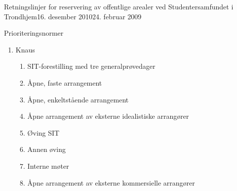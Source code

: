 \begin{instruks}{Retningslinjer for reservering av offentlige arealer
    ved Studentersamfundet i Trondhjem}{16. desember 2010}{24. februar 2009}
\begin{instruksledd}{Prioriteringsnormer}
\begin{enumerate}
\begin{enumerate}
\begin{enumerate}
                            \item Åpne, faste arrangement\footnote{Med ``åpne, faste
                                arrangement'' menes regelmessige arrangementer/konsepter som er åpne for alle og som
                                arrangeres av en av Samfundets gjenger.}
                            \item Fotball
                            \item Åpne, enkeltstående arrangement \footnote{Med ``åpne,
                                enkeltstående arrangement'' menes arrangementer som er åpne for alle og som arrangeres av en
                        av Samfundets gjenger, men som ikke faller inn under noe fast,
                        jevnlig konsept.}
                            \item Åpne arrangement av eksterne idealistiske arrangører (utlån)
                            \item Øvinger
                            \item Faste interne arrangement\footnote{For eksempel Mingle
                                Vingle}
                            \item Åpne arrangement av eksterne kommersielle arrangører (utleie)
                            \item Lukkete arrangement av eksterne arrangører (utleie)
                            \item  Interne møter
                            \item Interne fester
                        \end{enumerate}
                   \item Knaus
                        \begin{enumerate}
                            \item  SIT-forestilling med tre generalprøvedager
                            \item  Åpne, faste arrangement
                            \item  Åpne, enkeltstående arrangement
                            \item  Åpne arrangement av eksterne idealistiske arrangører
                            \item  Øving SIT
                            \item Annen øving
                            \item Interne møter
                            \item Åpne arrangement av eksterne kommersielle arrangører

\end{enumerate}
\end{enumerate}
\end{enumerate}
\end{instruksledd}
\end{instruks}
